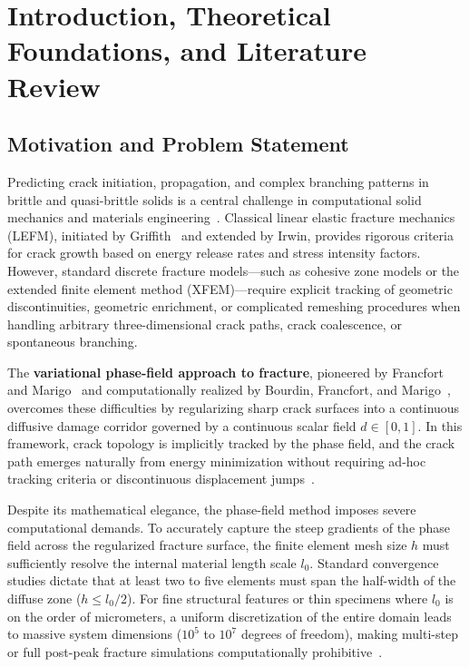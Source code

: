 \chapter{Introduction, Theoretical Foundations, and Literature Review}
\label{chap:intro_and_theory}

\section{Motivation and Problem Statement}
\label{sec:intro_motivation}

Predicting crack initiation, propagation, and complex branching patterns in brittle and quasi-brittle solids is a central challenge in computational solid mechanics and materials engineering~\cite{belytschko2014}. Classical linear elastic fracture mechanics (LEFM), initiated by Griffith~\cite{griffith1921} and extended by Irwin, provides rigorous criteria for crack growth based on energy release rates and stress intensity factors. However, standard discrete fracture models---such as cohesive zone models or the extended finite element method (XFEM)---require explicit tracking of geometric discontinuities, geometric enrichment, or complicated remeshing procedures when handling arbitrary three-dimensional crack paths, crack coalescence, or spontaneous branching.

The \textbf{variational phase-field approach to fracture}, pioneered by Francfort and Marigo~\cite{francfort1998} and computationally realized by Bourdin, Francfort, and Marigo~\cite{bourdin2000,bourdin2008}, overcomes these difficulties by regularizing sharp crack surfaces into a continuous diffusive damage corridor governed by a continuous scalar field $d \in [0, 1]$. In this framework, crack topology is implicitly tracked by the phase field, and the crack path emerges naturally from energy minimization without requiring ad-hoc tracking criteria or discontinuous displacement jumps~\cite{mesgarnejad2015}.

Despite its mathematical elegance, the phase-field method imposes severe computational demands. To accurately capture the steep gradients of the phase field across the regularized fracture surface, the finite element mesh size $h$ must sufficiently resolve the internal material length scale $l_0$. Standard convergence studies dictate that at least two to five elements must span the half-width of the diffuse zone ($h \le l_0/2$). For fine structural features or thin specimens where $l_0$ is on the order of micrometers, a uniform discretization of the entire domain leads to massive system dimensions ($10^5$ to $10^7$ degrees of freedom), making multi-step or full post-peak fracture simulations computationally prohibitive~\cite{heister2015,paul2020}.

